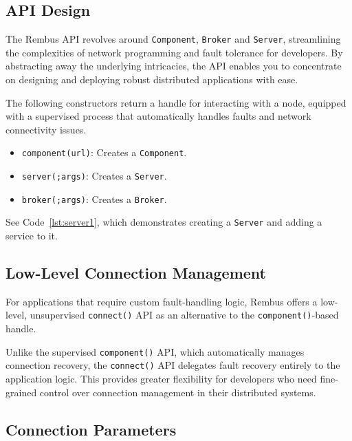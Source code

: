 \documentclass{juliacon}
\begin{document}
\subsection{API Design}\label{api-design}

The Rembus API revolves around \texttt{Component},
\texttt{Broker} and \texttt{Server}, streamlining the complexities of network
programming and fault tolerance for developers. By abstracting away the
underlying intricacies, the API enables you to concentrate on designing and
deploying robust distributed applications with ease.

\vskip 6pt

The following constructors return a handle for interacting with a node,
equipped with a supervised process that automatically handles faults and
network connectivity issues.

\begin{itemize}
\item
  \texttt{component(url)}: Creates a \texttt{Component}.
\item
  \texttt{server(;args)}: Creates a \texttt{Server}.
\item
  \texttt{broker(;args)}: Creates a \texttt{Broker}.
\end{itemize}

See Code~\ref{lst:server1}, which demonstrates creating a
\texttt{Server} and adding a service to it.

\subsection{Low-Level Connection
Management}\label{low-level-connection-management}

For applications that require custom fault-handling logic, Rembus offers a
low-level, unsupervised \texttt{connect()} API as an alternative to the
\texttt{component()}-based handle.
\vskip 6pt

Unlike the supervised \texttt{component()} API, which automatically manages
connection recovery, the \texttt{connect()} API delegates fault recovery
entirely to the application logic. This provides greater flexibility for
developers who need fine-grained control over connection management in their
distributed systems.

\subsection{Connection Parameters}\label{connection-parameters}
\end{document}
